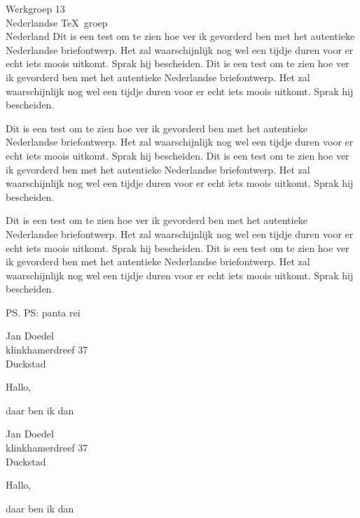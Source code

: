 \documentclass{brief}      %
\begin{document}
\begin{brief}{Werkgroep 13\\Nederlandse \TeX\ groep\\Nederland}
Dit is een test om te zien hoe ver ik gevorderd ben met het
autentieke Nederlandse briefontwerp.
Het zal waarschijnlijk nog wel een tijdje duren voor er
echt iets moois uitkomt. Sprak hij bescheiden.
Dit is een test om te zien hoe ver ik gevorderd ben met het
autentieke Nederlandse briefontwerp.
Het zal waarschijnlijk nog wel een tijdje duren voor er
echt iets moois uitkomt. Sprak hij bescheiden.
 
Dit is een test om te zien hoe ver ik gevorderd ben met het
autentieke Nederlandse briefontwerp.
Het zal waarschijnlijk nog wel een tijdje duren voor er
echt iets moois uitkomt. Sprak hij bescheiden.
Dit is een test om te zien hoe ver ik gevorderd ben met het
autentieke Nederlandse briefontwerp.
Het zal waarschijnlijk nog wel een tijdje duren voor er
echt iets moois uitkomt. Sprak hij bescheiden.
 
Dit is een test om te zien hoe ver ik gevorderd ben met het
autentieke Nederlandse briefontwerp.
Het zal waarschijnlijk nog wel een tijdje duren voor er
echt iets moois uitkomt. Sprak hij bescheiden.
Dit is een test om te zien hoe ver ik gevorderd ben met het
autentieke Nederlandse briefontwerp.
Het zal waarschijnlijk nog wel een tijdje duren voor er
echt iets moois uitkomt. Sprak hij bescheiden.
 
 
\ps{PS: panta rei}
 
 
\end{brief}
 
 
\begin{brief}{Jan Doedel\\ klinkhamerdreef 37\\ Duckstad}
\opening{Hallo,} daar ben ik dan 
\end{brief}
 
\begin{brief}{Jan Doedel\\ klinkhamerdreef 37\\ Duckstad}
\opening{Hallo,} daar ben ik dan 
\end{brief}
 
\end{document}
